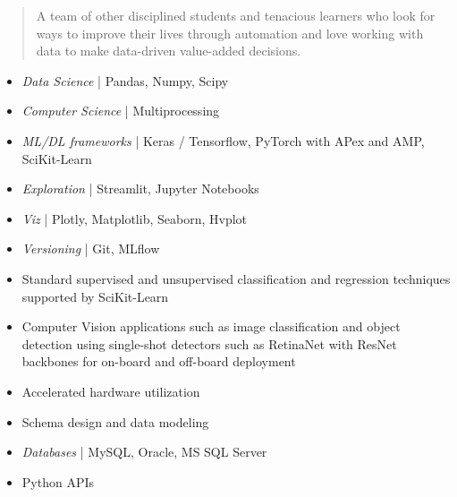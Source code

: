 \begin{quote}
A team of other disciplined students and tenacious learners who look for ways to improve their lives through automation and love working with data to make data-driven value-added decisions.
\end{quote}


\begin{itemize}
\item \textit{Data Science} | Pandas, Numpy, Scipy
\item \textit{Computer Science} | Multiprocessing
\item \textit{ML/DL frameworks} | Keras / Tensorflow, PyTorch with APex and AMP, SciKit-Learn
\item \textit{Exploration} | Streamlit, Jupyter Notebooks
\item \textit{Viz} | Plotly, Matplotlib, Seaborn, Hvplot
\item \textit{Versioning} | Git, MLflow

\end{itemize}

\begin{itemize}
\item Standard supervised and unsupervised classification and regression techniques supported by SciKit-Learn
\item Computer Vision applications such as image classification and object detection using single-shot detectors such as RetinaNet with ResNet backbones for on-board and off-board deployment
\item Accelerated hardware utilization

\end{itemize}

\begin{itemize}
\item Schema design and data modeling
\item \textit{Databases} | MySQL, Oracle, MS SQL Server
\item Python APIs

\end{itemize}

